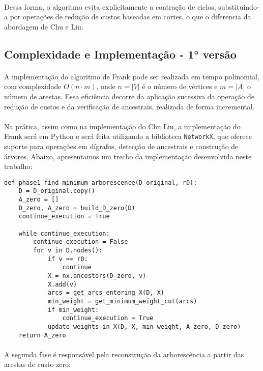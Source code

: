 \documentclass[12pt,a4paper]{article}
\begin{document}
\paragraph{}
Dessa forma, o algoritmo evita explicitamente a contração de ciclos, substituindo-a por operações de redução de custos baseadas em cortes, o que o diferencia da abordagem de Chu e Liu.

\subsection{Complexidade e Implementação - 1° versão}
\paragraph{}
A implementação do algoritmo de Frank pode ser realizada em tempo polinomial, com complexidade \(O(n \cdot m)\), onde \(n = |V|\) é o número de vértices e \(m = |A|\) o número de arestas. Essa eficiência decorre da aplicação sucessiva da operação de redução de custos e da verificação de ancestrais, realizada de forma incremental.

\paragraph{}
Na prática, assim como na implementação do Chu Liu, a implementação do Frank será em Python e será feita utilizando a biblioteca \texttt{NetworkX}, que oferece suporte para operações em dígrafos, detecção de ancestrais e construção de árvores. Abaixo, apresentamos um trecho da implementação desenvolvida neste trabalho:

\begin{verbatim}
def phase1_find_minimum_arborescence(D_original, r0):
    D = D_original.copy()
    A_zero = []
    D_zero, A_zero = build_D_zero(D)
    continue_execution = True

    while continue_execution:
        continue_execution = False
        for v in D.nodes():
            if v == r0:
                continue
            X = nx.ancestors(D_zero, v)
            X.add(v)
            arcs = get_arcs_entering_X(D, X)
            min_weight = get_minimum_weight_cut(arcs)
            if min_weight:
                continue_execution = True
            update_weights_in_X(D, X, min_weight, A_zero, D_zero)
    return A_zero
\end{verbatim}

\paragraph{}
A segunda fase é responsável pela reconstrução da arborescência a partir das arestas de custo zero:
\end{document}
